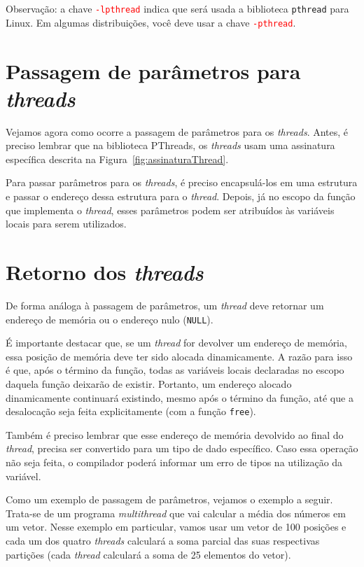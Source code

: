 \textcolor{orange}{\faWarning} Observação: a chave \textcolor{red}{\texttt{-lpthread}} indica que será usada a biblioteca \texttt{pthread} para Linux. Em algumas distribuições, você deve usar a chave \textcolor{red}{\texttt{-pthread}}.

\section{Passagem de parâmetros para \textit{threads}}
Vejamos agora como ocorre a passagem de parâmetros para os \textit{threads}. Antes, é preciso lembrar que na biblioteca PThreads, os \textit{threads} usam uma assinatura específica descrita na Figura~\ref{fig:assinaturaThread}. 

Para passar parâmetros para os \textit{threads}, é preciso encapsulá-los em uma estrutura e passar o endereço dessa estrutura para o \textit{thread}. Depois, já no escopo da função que implementa o \textit{thread}, esses parâmetros podem ser atribuídos às variáveis locais para serem utilizados.

\section{Retorno dos \textit{threads}}
De forma análoga à passagem de parâmetros, um \textit{thread} deve retornar um endereço de memória ou o endereço nulo (\texttt{NULL}).  

É importante destacar que, se um \textit{thread} for devolver um endereço de memória, essa posição de memória deve ter sido alocada dinamicamente. A razão para isso é que, após o término da função, todas as variáveis locais declaradas no escopo daquela função deixarão de existir. Portanto, um endereço alocado dinamicamente continuará existindo, mesmo após o término da função, até que a desalocação seja feita explicitamente (com a função \texttt{free}).

Também é preciso lembrar que esse endereço de memória devolvido ao final do \textit{thread}, precisa ser convertido para um tipo de dado específico. Caso essa operação não seja feita, o compilador poderá informar um erro de tipos na utilização da variável.

Como um exemplo de passagem de parâmetros, vejamos o exemplo a seguir. Trata-se de um programa \textit{multithread} que vai calcular a média dos números em um vetor. Nesse exemplo em particular, vamos usar um vetor de 100 posições e cada um dos quatro \textit{threads} calculará a soma parcial das suas respectivas partições (cada \textit{thread} calculará a soma de 25 elementos do vetor).

